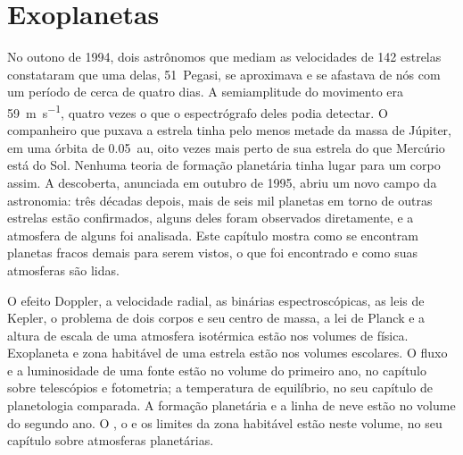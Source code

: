 \chapter{Exoplanetas}\label{ch:b3:exoplanets}

No outono de 1994, dois astrônomos que mediam as velocidades de 142
estrelas constataram que uma delas, 51~Pegasi, se aproximava e se afastava
de nós com um período de cerca de quatro dias. A semiamplitude do movimento era
\qty{59}{m.s^{-1}}, quatro vezes o que o espectrógrafo deles podia detectar. O
companheiro que puxava a estrela tinha pelo menos metade da massa de
Júpiter, em uma órbita de \qty{0.05}{au}, oito vezes mais perto de sua estrela
do que Mercúrio está do Sol. Nenhuma teoria de formação planetária tinha lugar para
um corpo assim. A descoberta, anunciada em outubro de 1995, abriu um novo campo
da astronomia: três décadas depois, mais de seis mil planetas em torno de
outras estrelas estão confirmados, alguns deles foram observados diretamente, e a
atmosfera de alguns foi analisada. Este capítulo mostra como se encontram planetas
fracos demais para serem vistos, o que foi encontrado e como suas atmosferas
são lidas.

\begin{recall}
O efeito Doppler, a velocidade radial, as binárias espectroscópicas, as leis de
Kepler, o problema de dois corpos e seu centro de massa, a lei de Planck e a
altura de escala de uma atmosfera isotérmica estão nos volumes de física.
Exoplaneta e zona habitável de uma estrela estão nos volumes escolares. O fluxo
e a luminosidade de uma fonte estão no volume do primeiro ano, no
capítulo sobre telescópios e fotometria; a temperatura de equilíbrio, no seu
capítulo de planetologia comparada. A formação planetária e a linha de neve
estão no volume do segundo ano. O , o  e os
limites da zona habitável estão neste volume, no seu capítulo sobre
atmosferas planetárias.
\end{recall}


